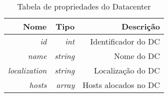 \begin{table}[!htb]
    \centering
    \caption[Representação do Datacenter(DC)]{Tabela de propriedades do Datacenter
    \label{tab:datacenter-shape}}
    \begin{tabular}{rrr}
        \toprule
            Nome & Tipo & Descrição \\ 
        \midrule
            \textit{id} & \textit{int} & Identificador do DC\\
            \textit{name} & \textit{string} & Nome do DC \\
            \textit{localization} & \textit{string} & Localização do DC \\
            \textit{hosts} & \textit{array} & Hosts alocados no DC \\
        \bottomrule
    \end{tabular}
\end{table}


